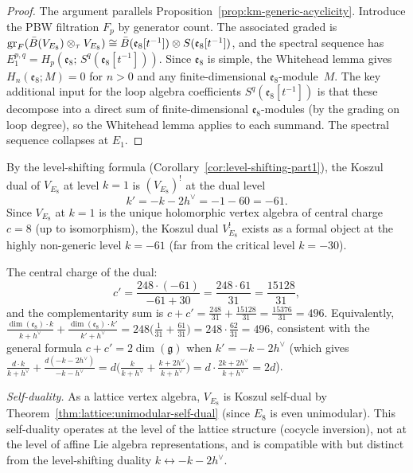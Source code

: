 \begin{proof}
The argument parallels Proposition~\ref{prop:km-generic-acyclicity}.
Introduce the PBW filtration $F_p$ by generator count.  The
associated graded is $\mathrm{gr}_F(\bar{B}(V_{E_8}) \otimes_\tau V_{E_8})
\cong \bar{B}(\mathfrak{e}_8[t^{-1}]) \otimes S(\mathfrak{e}_8[t^{-1}])$,
and the spectral sequence has
$E_1^{p,q} = H_p(\mathfrak{e}_8;\, S^q(\mathfrak{e}_8[t^{-1}]))$.
Since $\mathfrak{e}_8$ is simple, the Whitehead lemma gives
$H_n(\mathfrak{e}_8; M) = 0$ for $n > 0$ and any finite-dimensional
$\mathfrak{e}_8$-module~$M$.  The key additional input for the
loop algebra coefficients $S^q(\mathfrak{e}_8[t^{-1}])$ is
that these decompose into a direct sum of finite-dimensional
$\mathfrak{e}_8$-modules (by the grading on loop degree),
so the Whitehead lemma applies to each summand.
The spectral sequence collapses at $E_1$.
\end{proof}

\begin{computation}
\label{comp:E8-koszul-dual}
By the level-shifting formula
(Corollary~\ref{cor:level-shifting-part1}),
the Koszul dual of $V_{E_8}$ at level $k = 1$ is
$(V_{E_8})^!$ at the dual level
\[
k' = -k - 2h^\vee = -1 - 60 = -61.
\]
Since $V_{E_8}$ at $k = 1$ is the unique holomorphic vertex algebra
of central charge $c = 8$ (up to isomorphism), the Koszul dual
$V_{E_8}^!$ exists as a formal object at the highly non-generic
level $k = -61$ (far from the critical level $k = -30$).

The central charge of the dual:
\[
c' = \frac{248 \cdot (-61)}{-61 + 30} = \frac{248 \cdot 61}{31} = \frac{15128}{31},
\]
and the complementarity sum is
$c + c' = \frac{248}{31} + \frac{15128}{31} = \frac{15376}{31} = 496$.
Equivalently,
$\frac{\dim(\mathfrak{e}_8) \cdot k}{k+h^\vee} +
\frac{\dim(\mathfrak{e}_8) \cdot k'}{k'+h^\vee}
= 248\bigl(\tfrac{1}{31} + \tfrac{61}{31}\bigr)
= 248 \cdot \tfrac{62}{31} = 496$,
consistent with the general formula
$c + c' = 2\dim(\mathfrak{g})$ when $k' = -k - 2h^\vee$
(which gives $\frac{d \cdot k}{k + h^\vee} + \frac{d(-k-2h^\vee)}{-k-h^\vee}
= d\bigl(\frac{k}{k+h^\vee} + \frac{k+2h^\vee}{k+h^\vee}\bigr)
= d \cdot \frac{2k + 2h^\vee}{k+h^\vee} = 2d$).

\emph{Self-duality.}
As a lattice vertex algebra, $V_{E_8}$ is Koszul self-dual by
Theorem~\ref{thm:lattice:unimodular-self-dual} (since $E_8$ is
even unimodular).  This self-duality operates at the level of the
lattice structure (cocycle inversion), not at the level of affine
Lie algebra representations, and is compatible with but distinct from
the level-shifting duality $k \leftrightarrow -k - 2h^\vee$.
\end{computation}


